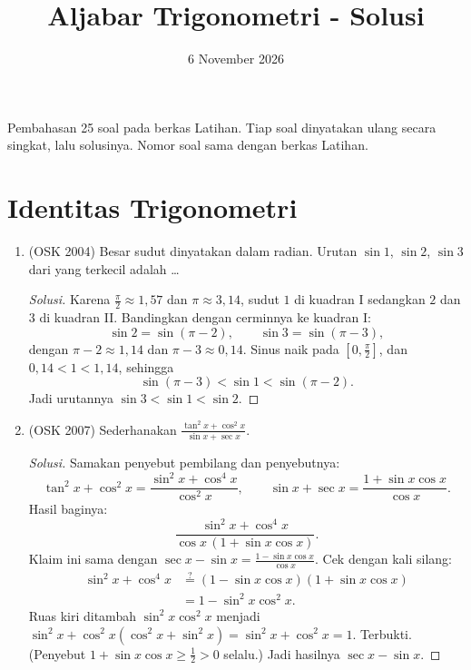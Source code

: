 \documentclass[12pt]{scrartcl}
\title{Aljabar Trigonometri - Solusi}
\date{6 November 2026}
\begin{document}
\maketitle

\renewcommand*\contentsname{Daftar Isi}
\tableofcontents

\newpage

Pembahasan 25 soal pada berkas Latihan. Tiap soal dinyatakan ulang secara
singkat, lalu solusinya. Nomor soal sama dengan berkas Latihan.

\section{Identitas Trigonometri}

\begin{enumerate}

	\item (OSK 2004)
	Besar sudut dinyatakan dalam radian. Urutan $\sin 1$, $\sin 2$, $\sin 3$
	dari yang terkecil adalah \dots
	\begin{proof}[Solusi]
	Karena $\frac{\pi}{2} \approx 1{,}57$ dan $\pi \approx 3{,}14$,
	sudut $1$ di kuadran I sedangkan $2$ dan $3$ di kuadran II.
	Bandingkan dengan cerminnya ke kuadran I:
	\[ \sin 2 = \sin(\pi-2), \qquad \sin 3 = \sin(\pi-3), \]
	dengan $\pi - 2 \approx 1{,}14$ dan $\pi - 3 \approx 0{,}14$.
	Sinus naik pada $[0, \frac{\pi}{2}]$, dan $0{,}14 < 1 < 1{,}14$, sehingga
	\[ \sin(\pi-3) < \sin 1 < \sin(\pi-2). \]
	Jadi urutannya $\sin 3 < \sin 1 < \sin 2$.
	\end{proof}

	\item (OSK 2007)
	Sederhanakan $\frac{\tan^{2}x+\cos^{2}x}{\sin x+\sec x}$.
	\begin{proof}[Solusi]
	Samakan penyebut pembilang dan penyebutnya:
	\[ \tan^2 x + \cos^2 x = \frac{\sin^2 x + \cos^4 x}{\cos^2 x},
	\qquad \sin x + \sec x = \frac{1+\sin x\cos x}{\cos x}. \]
	Hasil baginya:
	\[ \frac{\sin^2 x + \cos^4 x}{\cos x\,(1+\sin x\cos x)}. \]
	Klaim ini sama dengan $\sec x - \sin x = \frac{1-\sin x\cos x}{\cos x}$.
	Cek dengan kali silang:
	\begin{align*}
	\sin^2 x + \cos^4 x &\stackrel{?}{=} (1-\sin x\cos x)(1+\sin x\cos x) \\
	&= 1 - \sin^2 x\cos^2 x.
	\end{align*}
	Ruas kiri ditambah $\sin^2 x\cos^2 x$ menjadi
	$\sin^2 x + \cos^2 x(\cos^2 x + \sin^2 x) = \sin^2 x + \cos^2 x = 1$.
	Terbukti. (Penyebut $1+\sin x\cos x \ge \frac12 > 0$ selalu.)
	Jadi hasilnya $\sec x - \sin x$.
	\end{proof}


\end{enumerate}
\end{document}
